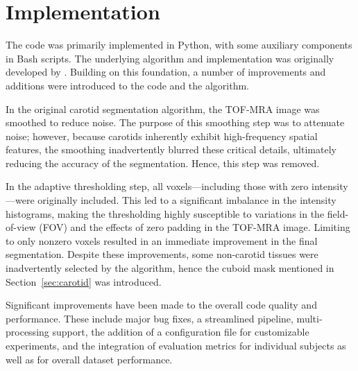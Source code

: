 \section{Implementation}
The code was primarily implemented in Python, with some auxiliary components in Bash scripts.
The underlying algorithm and implementation was originally developed by \citeauthor{irace2021bayesian} \cite{irace2021bayesian}. Building on this foundation, a number of improvements and additions were introduced to the code and the algorithm.

In the original carotid segmentation algorithm, the TOF-MRA image was smoothed to reduce noise.
The purpose of this smoothing step was to attenuate noise; however, because carotids inherently exhibit high-frequency spatial features, the smoothing inadvertently blurred these critical details, ultimately reducing the accuracy of the segmentation.
Hence, this step was removed.

In the adaptive thresholding step, all voxels—including those with zero intensity—were originally included.
This led to a significant imbalance in the intensity histograms, making the thresholding highly susceptible to variations in the field-of-view (FOV) and the effects of zero padding in the TOF-MRA image.
Limiting to only nonzero voxels resulted in an immediate improvement in the final segmentation.
Despite these improvements, some non-carotid tissues were inadvertently selected by the algorithm, hence the cuboid mask mentioned in Section~\ref{sec:carotid} was introduced.

Significant improvements have been made to the overall code quality and performance.
These include major bug fixes, a streamlined pipeline, multi-processing support, the addition of a configuration file for customizable experiments, and the integration of evaluation metrics for individual subjects as well as for overall dataset performance.
